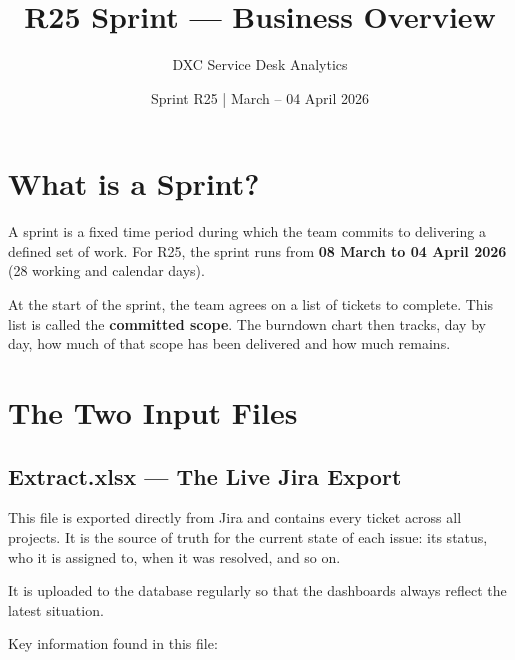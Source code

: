 \documentclass[12pt, a4paper]{article}
\title{\textbf{R25 Sprint --- Business Overview}}
\author{DXC Service Desk Analytics}
\date{Sprint R25 \quad|\quad 08 March -- 04 April 2026}
\begin{document}
\maketitle
\tableofcontents
\newpage

\section{What is a Sprint?}

A sprint is a fixed time period during which the team commits to delivering
a defined set of work. For R25, the sprint runs from \textbf{08 March to
04 April 2026} (28 working and calendar days).

At the start of the sprint, the team agrees on a list of tickets to complete.
This list is called the \textbf{committed scope}. The burndown chart then
tracks, day by day, how much of that scope has been delivered and how much
remains.

\section{The Two Input Files}

\subsection{Extract.xlsx --- The Live Jira Export}

This file is exported directly from Jira and contains every ticket across all
projects. It is the source of truth for the current state of each issue:
its status, who it is assigned to, when it was resolved, and so on.

It is uploaded to the database regularly so that the dashboards always
reflect the latest situation.

Key information found in this file:
\end{document}

